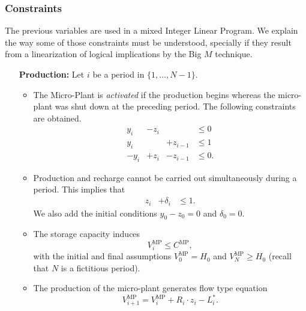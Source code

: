 \documentclass[11pt]{article}
\theoremstyle{plain}%
\theoremstyle{definition} \newtheorem{lem}{Lemma}[section]
\theoremstyle{definition} \newtheorem{claim}{Claim}[lem]
\theoremstyle{definition} \newtheorem{theorem}{Theorem}[section]
\theoremstyle{definition} \newtheorem{exo}{Exercice n$^\circ$}
\theoremstyle{definition} \newtheorem{quest}{}[exo]
\theoremstyle{definition} \newtheorem{sousquest}{}[quest]
\theoremstyle{remark}
\theoremstyle{definition}
\begin{document}
\subsubsection{Constraints}
%
The previous variables are used in a  mixed Integer Linear Program. We explain the way some of those constraints must be understood, specially if they result from  a linearization of logical implications by the Big $M$ technique.

\begin{enumerate} 
\item [\bf Production:]
Let $i$ be a period in $\{  1, \ldots, N - 1 \}$.
\begin{itemize}
\item %
The Micro-Plant is \emph{activated} if the production begins whereas 
the micro-plant was shut down at the preceding period.
The following constraints are obtained. 
\begin{displaymath}
\begin{array}{rlll}
y_i & - z_i & & \leq 0 \\
y_i & & + z_{i - 1}&  \leq 1  \\
-y_i  & + z_i & - z_{i - 1} &\leq 0. %
\end{array}
\end{displaymath}

\item Production and recharge cannot be carried out simultaneously during a period.
This implies that 
\begin{eqnarray}
 z_i & +\delta_i &  \leq 1. \nonumber
\end{eqnarray}
We also add the initial conditions  $y_0  -z_0  =0 $ and $\delta_0 =0$. %

\item The storage capacity induces
		$$V^{\textrm{MP}}_{i}\leq C^{\textrm{MP}},$$
		with the initial and final assumptions 
		$V^{\textrm{MP}}_{0}= H_0$ and $V^{\textrm{MP}}_{N} \geq H_0$ (recall that $N$ is a fictitious period).

\item The production of the micro-plant generates flow type equation
	 $$V^{\textrm{MP}}_{i+1}= V^{\textrm{MP}}_{i}+R_i \cdot z_i -  L^*_i.$$
	

\end{itemize}
\end{enumerate}
\end{document}
